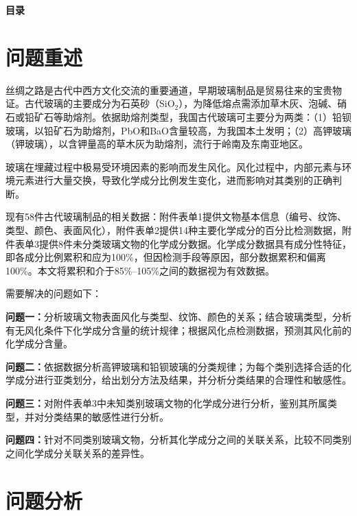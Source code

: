 \documentclass[fontset=windows, 12pt, a4paper]{ctexart}
\begin{document}
\setcounter{page}{1}
\begin{center}{\fontsize{17.3pt}{20.8pt}\heiti\bfseries 目录}\end{center}
\tableofcontents
\newpage

\section{问题重述}

丝绸之路是古代中西方文化交流的重要通道，早期玻璃制品是贸易往来的宝贵物证。古代玻璃的主要成分为石英砂（SiO$_2$），为降低熔点需添加草木灰、泡碱、硝石或铅矿石等助熔剂。依据助熔剂类型，我国古代玻璃可主要分为两类：（1）铅钡玻璃，以铅矿石为助熔剂，PbO和BaO含量较高，为我国本土发明；（2）高钾玻璃（钾玻璃），以含钾量高的草木灰为助熔剂，流行于岭南及东南亚地区。

玻璃在埋藏过程中极易受环境因素的影响而发生风化。风化过程中，内部元素与环境元素进行大量交换，导致化学成分比例发生变化，进而影响对其类别的正确判断。

现有58件古代玻璃制品的相关数据：附件表单1提供文物基本信息（编号、纹饰、类型、颜色、表面风化），附件表单2提供14种主要化学成分的百分比检测数据，附件表单3提供8件未分类玻璃文物的化学成分数据。化学成分数据具有成分性特征，即各成分比例累积和应为100\%，但因检测手段等原因，部分数据累积和偏离100\%。本文将累积和介于85\%--105\%之间的数据视为有效数据。

需要解决的问题如下：

\textbf{问题一：}分析玻璃文物表面风化与类型、纹饰、颜色的关系；结合玻璃类型，分析有无风化条件下化学成分含量的统计规律；根据风化点检测数据，预测其风化前的化学成分含量。

\textbf{问题二：}依据数据分析高钾玻璃和铅钡玻璃的分类规律；为每个类别选择合适的化学成分进行亚类划分，给出划分方法及结果，并分析分类结果的合理性和敏感性。

\textbf{问题三：}对附件表单3中未知类别玻璃文物的化学成分进行分析，鉴别其所属类型，并对分类结果的敏感性进行分析。

\textbf{问题四：}针对不同类别玻璃文物，分析其化学成分之间的关联关系，比较不同类别之间化学成分关联关系的差异性。

\newpage

\section{问题分析}
\end{document}
